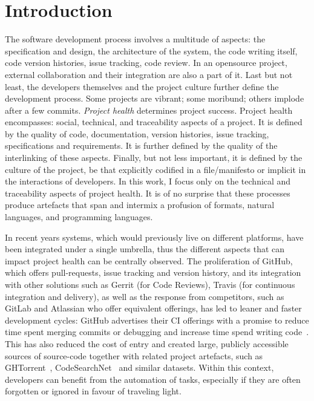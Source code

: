 \chapter{Introduction}
\label{chapter:introduction}

The software development process involves a multitude of aspects: the
specification and design, the architecture of the system, the code writing
itself, code version histories, issue tracking, code review. In an opensource
project, external collaboration and their integration are also a part of it.
Last but not least, the developers themselves and the project culture further
define the development process. Some projects are vibrant; some moribund; others
implode after a few commits. \emph{Project health} determines project success.
Project health encompasses: social, technical, and traceability aspects of a
project. It is defined by the quality of code, documentation, version histories,
issue tracking, specifications and requirements. It is further defined by the
quality of the interlinking of these aspects. Finally, but not less important,
it is defined by the culture of the project, be that explicitly codified in a
file/manifesto or implicit in the interactions of developers. In this work, I
focus only on the technical and traceability aspects of project health. It is of
no surprise that these processes produce artefacts that span and intermix a
profusion of formats, natural languages, and programming languages.

In recent years systems, which would previously live on different platforms,
have been integrated under a single umbrella, thus the different aspects that
can impact project health can be centrally observed. The proliferation of
GitHub, which offers pull-requests, issue tracking and version history, and its
integration with other solutions such as Gerrit (for Code Reviews), Travis (for
continuous integration and delivery), as well as the response from competitors,
such as GitLab and Atlassian who offer equivalent offerings, has led to leaner
and faster development cycles: GitHub advertises their CI offerings with a
promise to reduce time spent merging commits or debugging and increase time
spend writing code~\cite{GitHubCI}. This has also reduced the cost of entry and
created large, publicly accessible sources of source-code together with related
project artefacts, such as GHTorrent~\cite{GHTorrent},
CodeSearchNet~\cite{Husain2019} and similar datasets. Within this context,
developers can benefit from the automation of tasks, especially if they are
often forgotten or ignored in favour of traveling light. 

